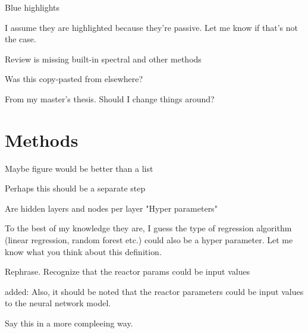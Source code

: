 \documentclass[answers,11pt]{exam}
\begin{document}
\begin{questions}
        \question
        Blue highlights

        \begin{solution}
        I assume they are highlighted because they're passive.
        Let me know if that's not the case.
        \end{solution}

        \question
        Review is missing built-in spectral and other methods

        \begin{solution}

        \end{solution}

        \question
        Was this copy-pasted from elsewhere?

        \begin{solution}
        From my master's thesis. Should I change things around?
        \end{solution}


\section*{Methods}
        \question
        Maybe figure would be better than a list

        Perhaps this should be a separate step

        \begin{solution}

        \end{solution}

        \question
        Are hidden layers and nodes per layer "Hyper parameters"

        \begin{solution}
        To the best of my knowledge they are, I guess the type of 
        regression algorithm (linear regression, random forest etc.)
        could also be a hyper parameter. Let me know what you think
        about this definition.
        \end{solution}

        \question
        Rephrase. Recognize that the reactor params could be input
        values

        \begin{solution}
        added:
            Also, it should be noted that the reactor
            parameters could be input values to the neural network model.
        \end{solution}

        \question
        Say this in a more compleeing way.


\end{questions}
\end{document}
